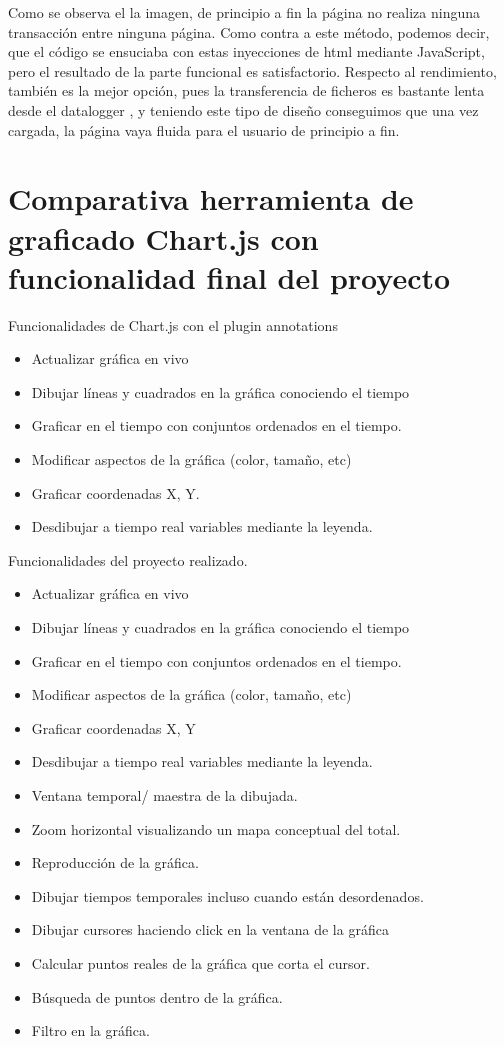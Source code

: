 
Como se observa el la imagen, de principio a fin la página no realiza ninguna transacción entre ninguna página.
Como contra a este método, podemos decir, que el código se ensuciaba con estas inyecciones de html mediante JavaScript, pero el resultado de la parte funcional es satisfactorio.
Respecto al rendimiento, también es la mejor opción, pues la transferencia de ficheros es bastante lenta desde el datalogger , y teniendo este tipo de diseño conseguimos que una vez cargada, la página vaya fluida para el usuario de principio a fin.



\section{Comparativa herramienta de graficado Chart.js con funcionalidad final del proyecto}

Funcionalidades de Chart.js con el plugin annotations
\begin{itemize}
	\item Actualizar gráfica en vivo
	\item Dibujar líneas y cuadrados en la gráfica conociendo el tiempo
	\item Graficar en el tiempo con conjuntos ordenados en el tiempo.
	\item Modificar aspectos de la gráfica (color, tamaño, etc)
	\item Graficar coordenadas X, Y.
	\item Desdibujar a tiempo real variables mediante la leyenda.
\end{itemize}



Funcionalidades del proyecto realizado.
\begin{itemize}
	\item Actualizar gráfica en vivo
	\item Dibujar líneas y cuadrados en la gráfica conociendo el tiempo
	\item Graficar en el tiempo con conjuntos ordenados en el tiempo.
	\item Modificar aspectos de la gráfica (color, tamaño, etc)
	\item Graficar coordenadas X, Y
	\item Desdibujar a tiempo real variables mediante la leyenda.
	\item Ventana temporal/ maestra de la dibujada.
	\item Zoom horizontal visualizando un mapa conceptual del total.
	\item Reproducción de la gráfica.
	\item Dibujar tiempos temporales incluso cuando están desordenados.
	\item Dibujar cursores haciendo click en la ventana de la gráfica
	\item Calcular puntos reales de la gráfica que corta el cursor.
	\item Búsqueda de puntos dentro de la gráfica.
	\item Filtro en la gráfica.
\end{itemize}


